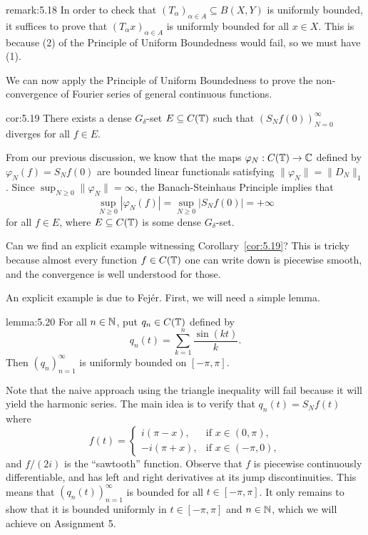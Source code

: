 \begin{remark}{remark:5.18}
    In order to check that $(T_\alpha)_{\alpha \in A} \subseteq 
    B(X, Y)$ is uniformly bounded, it suffices to prove that 
    $(T_\alpha x)_{\alpha \in A}$ is uniformly bounded for all $x \in X$. 
    This is because (2) of the Principle of Uniform Boundedness would fail, 
    so we must have (1). 
\end{remark}

We can now apply the Principle of Uniform Boundedness to prove the 
non-convergence of Fourier series of general continuous functions. 

\begin{cor}{cor:5.19}
    There exists a dense $G_\delta$-set $E \subseteq C(\mathbb{T})$ such that 
    $(S_N f(0))_{N=0}^\infty$ diverges for all $f \in E$. 
\end{cor}
\begin{pf}
    From our previous discussion, we know that the maps 
    $\varphi_N : C(\mathbb{T}) \to \mathbb{C}$ defined by 
    $\varphi_N(f) = S_N f(0)$ are bounded linear functionals satisfying 
    $\|\varphi_N\| = \|D_N\|_1$. Since $\sup_{N\geq 0} \|\varphi_N\| = \infty$, the 
    Banach-Steinhaus Principle implies that 
    \[ \sup_{N\geq 0} |\varphi_N(f)| = \sup_{N\geq 0} |S_N f(0)| = +\infty \] 
    for all $f \in E$, where $E \subseteq C(\mathbb{T})$ is some dense 
    $G_\delta$-set. 
\end{pf}

Can we find an explicit example witnessing Corollary~\ref{cor:5.19}? This 
is tricky because almost every function $f \in C(\mathbb{T})$ one can write down 
is piecewise smooth, and the convergence is well understood for those. 

An explicit example is due to Fej\'er. First, we will need a simple lemma. 

\begin{lemma}{lemma:5.20}
    For all $n \in \mathbb{N}$, put $q_n \in C(\mathbb{T})$ defined by 
    \[ q_n(t) = \sum_{k=1}^n \frac{\sin(kt)}{k}. \] 
    Then $(q_n)_{n=1}^\infty$ is uniformly bounded on $[-\pi, \pi]$. 
\end{lemma}
\begin{pf}
    Note that the naive approach using 
    the triangle inequality will fail because it will yield the harmonic 
    series. The main idea is to verify that $q_n(t) = S_N f(t)$ where 
    \[ f(t) = \begin{cases}
        i(\pi - x), & \text{if } x \in (0, \pi), \\ 
        -i(\pi + x), & \text{if } x \in (-\pi, 0),
    \end{cases} \] 
    and $f/(2i)$ is the ``sawtooth'' function. Observe that $f$ is 
    piecewise continuously differentiable, and has left and right 
    derivatives at its jump discontinuities. This means that 
    $(q_n(t))_{n=1}^\infty$ is bounded for all $t \in [-\pi, \pi]$. 
    It only remains to show that it is bounded uniformly in $t \in [-\pi, \pi]$ 
    and $n \in \mathbb{N}$, which we will achieve on Assignment 5. 
\end{pf}